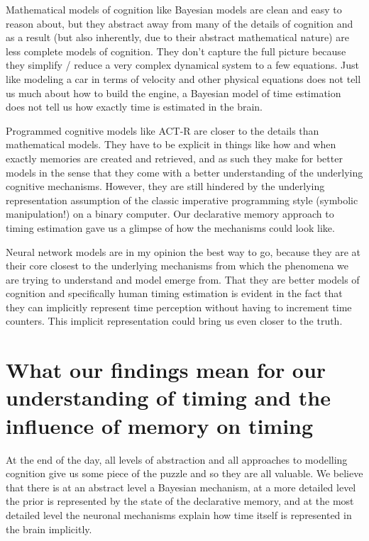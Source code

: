 \documentclass{article}
\begin{document}
Mathematical models of cognition like Bayesian models are clean and easy to reason about, but they abstract away from many of the details of cognition and as a result (but also inherently, due to their abstract mathematical nature) are less complete models of cognition. They don't capture the full picture because they simplify / reduce a very complex dynamical system to a few equations. Just like modeling a car in terms of velocity and other physical equations does not tell us much about how to build the engine, a Bayesian model of time estimation does not tell us how exactly time is estimated in the brain.

Programmed cognitive models like ACT-R are closer to the details than mathematical models. They have to be explicit in things like how and when exactly memories are created and retrieved, and as such they make for better models in the sense that they come with a better understanding of the underlying cognitive mechanisms. However, they are still hindered by the underlying representation assumption of the classic imperative programming style (symbolic manipulation!) on a binary computer. Our declarative memory approach to timing estimation gave us a glimpse of how the mechanisms could look like.

Neural network models are in my opinion the best way to go, because they are at their core closest to the underlying mechanisms from which the phenomena we are trying to understand and model emerge from. That they are better models of cognition and specifically human timing estimation is evident in the fact that they can implicitly represent time perception without having to increment time counters. This implicit representation could bring us even closer to the truth.


\section{What our findings mean for our understanding of timing and the influence of memory on timing}

At the end of the day, all levels of abstraction and all approaches to modelling cognition give us some piece of the puzzle and so they are all valuable. We believe that there is at an abstract level a Bayesian mechanism, at a more detailed level the prior is represented by the state of the declarative memory, and at the most detailed level the neuronal mechanisms explain how time itself is represented in the brain implicitly.
\end{document}
